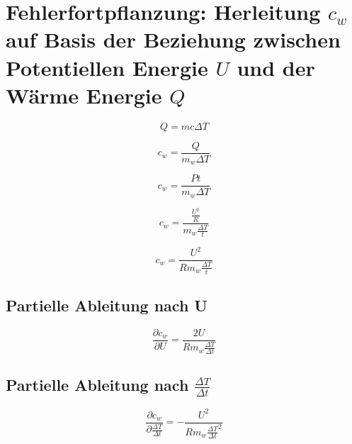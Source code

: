 \documentclass[10pt,a4paper]{article}
\begin{document}
\newpage
\thispagestyle{plain}
\tableofcontents
\newpage

\section{Fehlerfortpflanzung: Herleitung $c_w$ auf Basis der Beziehung zwischen Potentiellen Energie $U$ und der Wärme Energie $Q$}
\begin{equation}
    Q = m c \Delta T
\end{equation}

\begin{equation}
    c_w = \frac{Q}{m_w \Delta T}
\end{equation}

\begin{equation}
    c_w = \frac{P t}{m_w \Delta T}
\end{equation}

\begin{equation}
    c_w = \frac{\frac{U^2}{R}}{m_w \frac{\Delta T}{t}}
\end{equation}

\begin{equation}
    c_w = \frac{U^2}{R m_w \frac{\Delta T}{t}}
\end{equation}

\subsection{Partielle Ableitung nach U}

\begin{equation}
    \frac{\partial c_w}{\partial U} = \frac{2 U}{R m_w \frac{\Delta T}{\Delta t}}
\end{equation}

\subsection{Partielle Ableitung nach $\frac{\Delta T}{\Delta t}$}

\begin{equation}
    \frac{\partial c_w}{\partial \frac{\Delta T}{\Delta t}} = - \frac{U^2}{R m_w \frac{\Delta T}{\Delta t}^2}
\end{equation}
\end{document}
